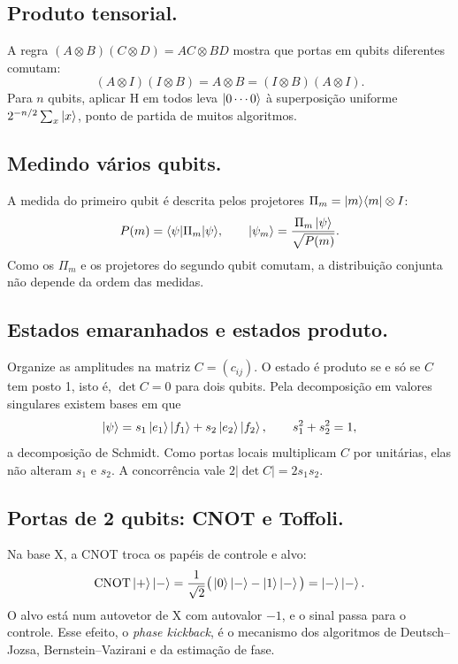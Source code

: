 \subsection{Produto tensorial.}
A regra $(A\otimes B)(C\otimes D) = AC\otimes BD$ mostra que portas em qubits diferentes comutam:
\begin{equation}
    (A\otimes I)(I\otimes B) = A\otimes B = (I\otimes B)(A\otimes I).
\end{equation}
Para $n$ qubits, aplicar H em todos leva $\left|{0\cdots0}\right>$ à superposição uniforme $2^{-n/2}\sum_x \left|{x}\right>$, ponto de partida de muitos algoritmos.

\subsection{Medindo vários qubits.}
A medida do primeiro qubit é descrita pelos projetores $\Pi_m = |{m}\rangle\langle{m}|\otimes I$:
\begin{equation}
    P(m) = \langle{\psi}|{\Pi_m}|{\psi}\rangle, \qquad \left|{\psi_m}\right> = \frac{\Pi_m\left|{\psi}\right>}{\sqrt{P(m)}}.
\end{equation}
Como os $\Pi_m$ e os projetores do segundo qubit comutam, a distribuição conjunta não depende da ordem das medidas.

\subsection{Estados emaranhados e estados produto.}
Organize as amplitudes na matriz $C = (c_{ij})$. O estado é produto se e só se $C$ tem posto 1, isto é, $\det C = 0$ para dois qubits. Pela decomposição em valores singulares existem bases em que
\begin{equation}
    \left|{\psi}\right> = s_1\left|{e_1}\right>\left|{f_1}\right> + s_2\left|{e_2}\right>\left|{f_2}\right>, \qquad s_1^2+s_2^2=1,
\end{equation}
a decomposição de Schmidt. Como portas locais multiplicam $C$ por unitárias, elas não alteram $s_1$ e $s_2$. A concorrência vale $2|\det C| = 2 s_1 s_2$.

\subsection{Portas de 2 qubits: CNOT e Toffoli.}
Na base X, a CNOT troca os papéis de controle e alvo:
\begin{equation}
    \text{CNOT}\left|{+}\right>\left|{-}\right> = \frac{1}{\sqrt2}\big(\left|{0}\right>\left|{-}\right> - \left|{1}\right>\left|{-}\right>\big) = \left|{-}\right>\left|{-}\right>.
\end{equation}
O alvo está num autovetor de X com autovalor $-1$, e o sinal passa para o controle. Esse efeito, o \textit{phase kickback}, é o mecanismo dos algoritmos de Deutsch--Jozsa, Bernstein--Vazirani e da estimação de fase.


